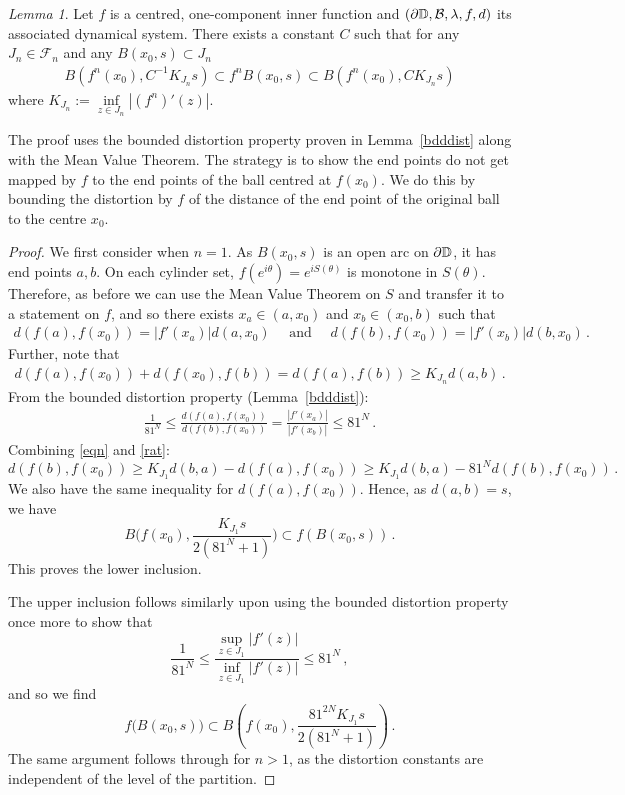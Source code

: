 \documentclass[11pt,reqno]{amsart}
\newcommand{\D}{{\Bbb D}}
\newcommand{\0}{\mathbf{0}}
\newtheorem{lemma}{Lemma}
\theoremstyle{remark}
\numberwithin{equation}{section}
\newtheorem{lemma}[theorem]{Lemma}
\theoremstyle{remark}
\numberwithin{equation}{section}
\begin{document}
\begin{lemma}\label{lcondconf}
    Let $f$ is a centred, one-component inner function and $(\partial \D,\mathcal{B},\lambda,f,d)$ its associated dynamical system. There exists a constant $C$ such that for any $J_n \in \mathcal{F}_n$ and any $B(x_0,s) \subset J_n$
\begin{eqnarray}\label{condconf}
    B(f^n(x_0), C^{-1}K_{J_n}s) \subset f^nB(x_0,s) \subset B(f^n(x_0),CK_{J_n}s) 
\end{eqnarray}
    where $K_{J_n}:=\inf\limits_{z \in J_n}|(f^n)'(z)|$.
\end{lemma}
The proof uses the bounded distortion property proven in Lemma~\ref{bdddist} along with the Mean Value Theorem. The strategy is to show the end points  do  not get mapped by $f$ to the end points of the ball centred at $f(x_0)$. We do this by  bounding the distortion by $f$ of the distance of the end point of the original ball to the centre $x_0$.
\begin{proof}
We first consider when $n=1$.
As $B(x_0,s)$ is an open arc on $\partial \D$, it has end points $a,b$. On each cylinder set, $f(e^{i\theta})=e^{iS(\theta)}$ is monotone in $S(\theta)$. Therefore, as before we can use the Mean Value Theorem on $S$ and transfer it to a statement on $f$, and so there exists  $x_a \in  (a,x_0)$ and $x_b \in  (x_0,b)$ such that
\begin{eqnarray}
    d(f(a),f(x_0)) =|f'(x_a)|d(a,x_0)\quad \text{ \ and \ } \quad  d(f(b),f(x_0)) =|f'(x_b)|d(b,x_0) \, .
\end{eqnarray}
Further, note that
\begin{eqnarray}\label{eqn}
    d(f(a),f(x_0))+ d(f(x_0),f(b))=  d(f(a),f(b)) \geq K_{J_n}d(a,b) \, .
\end{eqnarray}
From the bounded distortion property (Lemma~\ref{bdddist}):
\begin{eqnarray}\label{rat}
    \frac{1}{81^N} \leq \frac{d(f(a),f(x_0))}{d(f(b),f(x_0))}=\frac{|f'(x_a)|}{|f'(x_b)|} \leq 81^N \, .
\end{eqnarray}
Combining \eqref{eqn} and \eqref{rat}:
$$
d(f(b),f(x_0)) \geq K_{J_1}d(b,a) - d(f(a),f(x_0)) \geq K_{J_1}d(b,a)-81^Nd(f(b),f(x_0)) \, .$$
We also have the same inequality for $d(f(a),f(x_0))$. Hence, as $d(a,b)=s$, we have
$$
B\Big(f(x_0),\frac{K_{J_1}s}{2(81^N+1)}\Big) \subset f(B(x_0,s))\, .
$$
This proves the lower inclusion. 

The upper inclusion follows similarly upon using the bounded distortion property once more to show that 
$$
 \frac{1}{81^N} \leq \frac{\sup_{z \in J_1}|f'(z)|}{\inf_{z \in J_1}|f'(z)|} \leq 81^N \, ,
$$
and so we find 
$$
f\big(B(x_0,s)\big) \subset B\left(f(x_0),\frac{81^{2N}K_{J_1}s}{2(81^N+1)}\right) \, .
$$
The same argument follows through for $n>1$, as the distortion constants are independent of the level of the partition.
\end{proof}
\end{document}
